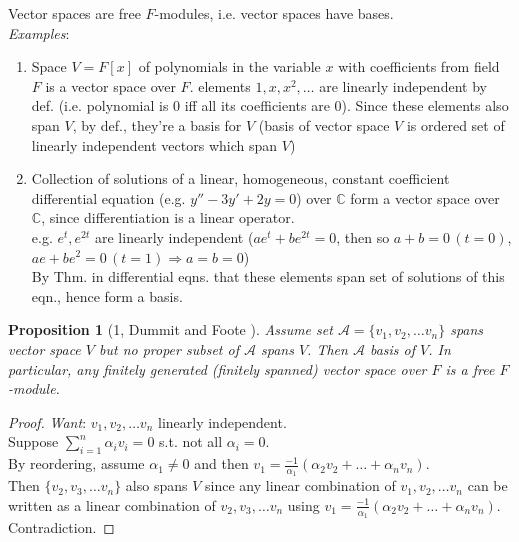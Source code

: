 \documentclass[10pt]{amsart}
\newtheorem{proposition}{Proposition}
\begin{document}
\begin{multicols*}{2}
Vector spaces are free $F$-modules, i.e. vector spaces have bases.  \\

\emph{Examples}:

\begin{enumerate}
	\item Space $V= F[x]$ of polynomials in the variable $x$ with coefficients from field $F$ is a vector space over $F$. elements $1,x,x^2, \dots $ are linearly independent by def. (i.e. polynomial is $0$ iff all its coefficients are $0$). Since these elements also span $V$, by def., they're a basis for $V$ (basis of vector space $V$ is ordered set of linearly independent vectors which span $V$)
	\item Collection of solutions of a linear, homogeneous, constant coefficient differential equation (e.g. $y'' - 3y' + 2y = 0$) over $\mathbb{C}$ form a vector space over $\mathbb{C}$, since differentiation is a linear operator. \\
 	e.g. $e^t, e^{2t}$ are linearly independent ($ae^t + be^{2t} =0$, then so $a+b =0 \, (t=0)$, $ae + be^2 = 0 \, (t=1) \Longrightarrow a=b=0$) \\
 	By Thm. in differential eqns. that these elements span set of solutions of this eqn., hence form a basis.
\end{enumerate}

\begin{proposition}[1, Dummit and Foote \cite{DuFo2003}]
	Assume set $\mathcal{A} = \lbrace v_1, v_2 , \dots v_n \rbrace$ spans vector space $V$ but no proper subset of $\mathcal{A}$ spans $V$. Then $\mathcal{A}$ basis of $V$. In particular, any finitely generated (finitely spanned) vector space over $F$ is a free $F$-module.
\end{proposition}

\begin{proof}
\emph{Want}: $v_1, v_2, \dots v_n$ linearly independent. \\

Suppose $\sum_{i=1}^n \alpha_i v_i = 0$ s.t. not all $\alpha_i = 0$. \\

By reordering, assume $\alpha_1 \neq 0$ and then $v_1 = \frac{-1}{\alpha_1} (\alpha_2 v_2 + \dots + \alpha_n v_n)$. \\
Then $\lbrace v_2, v_3, \dots v_n \rbrace$ also spans $V$ since any linear combination of $v_1, v_2, \dots v_n$ can be written as a linear combination of $v_2, v_3, \dots v_n$ using $v_1 = \frac{-1}{\alpha_1} (\alpha_2 v_2 + \dots + \alpha_n v_n)$. Contradiction.	
	

\end{proof}
\end{multicols*}
\end{document}
